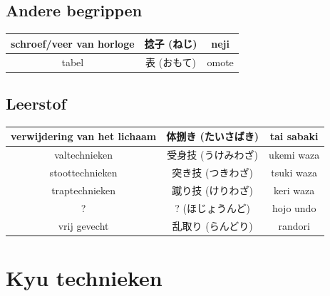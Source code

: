 \documentclass[12pt]{scrartcl}
\begin{document}
\begin{CJK*}{UTF8}{min}
\subsection{Andere begrippen}
\begin{table}[H]
\begin{center}
\begin{tabular}{c|c|c}
schroef/veer van horloge & 捻子 (ねじ) & neji\\
\hline
tabel & 表 (おもて) & omote
\end{tabular}
\end{center}
\end{table}

\subsection{Leerstof}
\begin{table}[H]
\begin{center}
\begin{tabular}{c|c|c}
verwijdering van het lichaam & 体捌き (たいさばき) & tai sabaki\\
\hline
valtechnieken & 受身技 (うけみわざ) & ukemi waza\\
\hline
stoottechnieken & 突き技 (つきわざ) & tsuki waza\\
\hline
traptechnieken & 蹴り技 (けりわざ) & keri waza\\
\hline
? & ? (ほじょうんど) & hojo undo\\
\hline
vrij gevecht & 乱取り (らんどり) & randori
\end{tabular}
\end{center}
\end{table}

\newpage
\section{Kyu technieken}

\end{CJK*}
\end{document}
